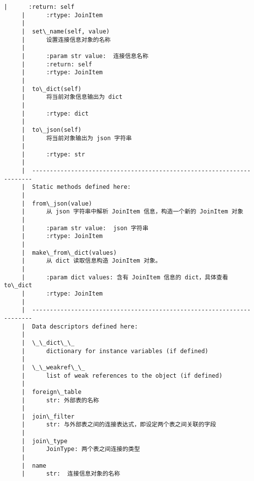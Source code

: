 \documentclass[11pt]{article}
\begin{document}
\begin{Verbatim}[commandchars=\\\{\}]
     |      :return: self
     |      :rtype: JoinItem
     |  
     |  set\_name(self, value)
     |      设置连接信息对象的名称
     |      
     |      :param str value:  连接信息名称
     |      :return: self
     |      :rtype: JoinItem
     |  
     |  to\_dict(self)
     |      将当前对象信息输出为 dict
     |      
     |      :rtype: dict
     |  
     |  to\_json(self)
     |      将当前对象输出为 json 字符串
     |      
     |      :rtype: str
     |  
     |  ----------------------------------------------------------------------
     |  Static methods defined here:
     |  
     |  from\_json(value)
     |      从 json 字符串中解析 JoinItem 信息，构造一个新的 JoinItem 对象
     |      
     |      :param str value:  json 字符串
     |      :rtype: JoinItem
     |  
     |  make\_from\_dict(values)
     |      从 dict 读取信息构造 JoinItem 对象。
     |      
     |      :param dict values: 含有 JoinItem 信息的 dict，具体查看 to\_dict
     |      :rtype: JoinItem
     |  
     |  ----------------------------------------------------------------------
     |  Data descriptors defined here:
     |  
     |  \_\_dict\_\_
     |      dictionary for instance variables (if defined)
     |  
     |  \_\_weakref\_\_
     |      list of weak references to the object (if defined)
     |  
     |  foreign\_table
     |      str: 外部表的名称
     |  
     |  join\_filter
     |      str: 与外部表之间的连接表达式，即设定两个表之间关联的字段
     |  
     |  join\_type
     |      JoinType: 两个表之间连接的类型
     |  
     |  name
     |      str:  连接信息对象的名称
    

\end{Verbatim}
\end{document}

